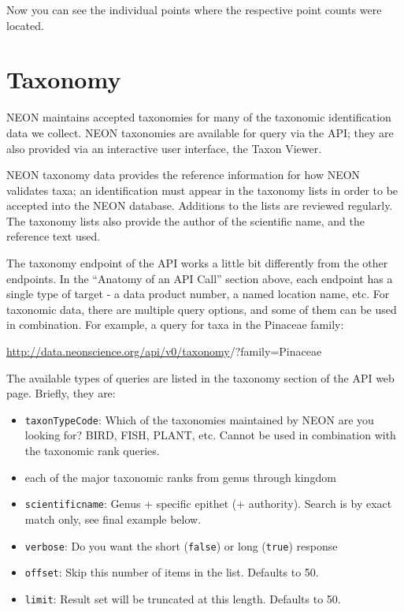 \documentclass[]{book}
\providecommand{\tightlist}{%
  \setlength{\itemsep}{0pt}\setlength{\parskip}{0pt}}
\begin{document}
Now you can see the individual points where the respective point counts were
located.

\hypertarget{taxonomy}{%
\section{Taxonomy}\label{taxonomy}}

NEON maintains accepted taxonomies for many of the taxonomic identification
data we collect. NEON taxonomies are available for query via the API; they
are also provided via an interactive user interface, the Taxon Viewer.

NEON taxonomy data provides the reference information for how NEON
validates taxa; an identification must appear in the taxonomy lists
in order to be accepted into the NEON database. Additions to the lists
are reviewed regularly. The taxonomy lists also provide the author
of the scientific name, and the reference text used.

The taxonomy endpoint of the API works a little bit differently from the
other endpoints. In the ``Anatomy of an API Call'' section above, each
endpoint has a single type of target - a data product number, a named
location name, etc. For taxonomic data, there are multiple query
options, and some of them can be used in combination.
For example, a query for taxa in the Pinaceae family:

{\url{http://data.neonscience.org/api/v0/taxonomy}}{/?family=Pinaceae}

The available types of queries are listed in the taxonomy section
of the API web page. Briefly, they are:

\begin{itemize}
\tightlist
\item
  \texttt{taxonTypeCode}: Which of the taxonomies maintained by NEON are you
  looking for? BIRD, FISH, PLANT, etc. Cannot be used in combination
  with the taxonomic rank queries.
\item
  each of the major taxonomic ranks from genus through kingdom
\item
  \texttt{scientificname}: Genus + specific epithet (+ authority). Search is
  by exact match only, see final example below.
\item
  \texttt{verbose}: Do you want the short (\texttt{false}) or long (\texttt{true}) response
\item
  \texttt{offset}: Skip this number of items in the list. Defaults to 50.
\item
  \texttt{limit}: Result set will be truncated at this length. Defaults to 50.
\end{itemize}
\end{document}
